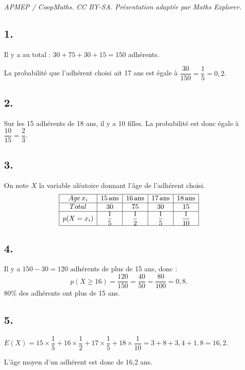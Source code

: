 \documentclass[10pt]{article}
\begin{document}
\noindent\textit{APMEP / CoopMaths. CC BY-SA. Présentation adaptée par Maths Explorer.}\par\medskip
\subsection*{1.}

Il y a au total : \(30 + 75 + 30 + 15 = 150\) adhérents.

La probabilité que l'adhérent choisi ait 17 ans est égale à \(\dfrac{30}{150} = \dfrac{1}{5} = 0,2\).

\subsection*{2.}

Sur les 15 adhérents de 18 ans, il y a 10 filles. La probabilité est donc égale à \(\dfrac{10}{15} = \dfrac{2}{3}\).

\subsection*{3.}

On note \(X\) la variable aléatoire donnant l'âge de l'adhérent choisi.
\[
\begin{array}{|c|c|c|c|c|}
\hline
Age \, x_i & 15 \, \text{ans} & 16 \, \text{ans} & 17 \, \text{ans} & 18 \, \text{ans} \\
\hline
Total & 30 & 75 & 30 & 15 \\
\hline
p(X = x_i) & \dfrac{1}{5} & \dfrac{1}{2} & \dfrac{1}{5} & \dfrac{1}{10} \\
\hline
\end{array}
\]

\subsection*{4.}

Il y a \(150 - 30 = 120\) adhérents de plus de 15 ans, donc :
\[
p(X \geqslant 16) = \dfrac{120}{150} = \dfrac{40}{50} = \dfrac{80}{100} = 0,8.
\]
80\% des adhérents ont plus de 15 ans.

\subsection*{5.}

\(
E(X) = 15 \times \dfrac{1}{5} + 16 \times \dfrac{1}{2} + 17 \times \dfrac{1}{5} + 18 \times \dfrac{1}{10} = 3 + 8 + 3,4 + 1,8 = 16,2.
\)

L'âge moyen d'un adhérent est donc de 16,2 ans.
\end{document}
